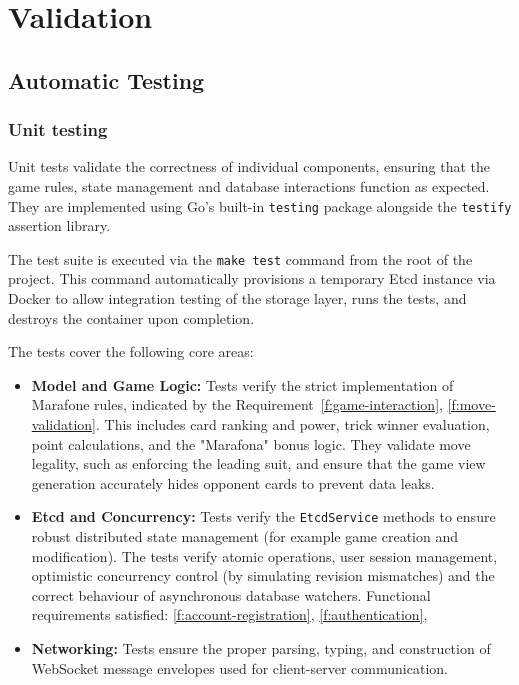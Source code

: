 \documentclass{scrartcl}
\begin{document}
\section{Validation}\label{validation}

\subsection{Automatic Testing}\label{automatic-testing}
\subsubsection*{Unit testing}
Unit tests validate the correctness of individual components, ensuring that the game rules, state management and database interactions function as expected. They are implemented using Go's built-in \texttt{testing} package alongside the \texttt{testify} assertion library. 

The test suite is executed via the \texttt{make test} command from the root of the project. This command automatically provisions a temporary Etcd instance via Docker to allow integration testing of the storage layer, runs the tests, and destroys the container upon completion.

The tests cover the following core areas:
\begin{itemize}
  \item \textbf{Model and Game Logic:} Tests verify the strict implementation of Marafone rules, indicated by the Requirement~\ref{f:game-interaction}, \ref{f:move-validation}. This includes card ranking and power, trick winner evaluation, point calculations, and the "Marafona" bonus logic. They validate move legality, such as enforcing the leading suit, and ensure that the game view generation accurately hides opponent cards to prevent data leaks.
  \item \textbf{Etcd and Concurrency:} Tests verify the \texttt{EtcdService} methods to ensure robust distributed state management (for example game creation and modification). The tests verify atomic operations, user session management, optimistic concurrency control (by simulating revision mismatches) and the correct behaviour of asynchronous database watchers. Functional requirements satisfied: \ref{f:account-registration}, \ref{f:authentication}, 
  \item \textbf{Networking:} Tests ensure the proper parsing, typing, and construction of WebSocket message envelopes used for client-server communication.
\end{itemize}
\end{document}
